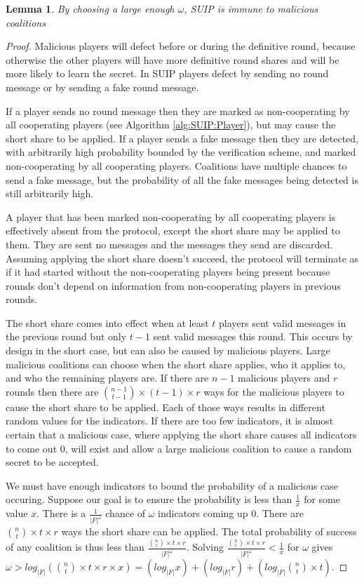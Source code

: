 \documentclass{dalcsthesis}
\newtheorem{lemma}{Lemma}
\begin{document}
\begin{lemma} By choosing a large enough $\omega$, SUIP is immune to malicious coalitions \end{lemma}
\begin{proof}
Malicious players will defect before or during the definitive round, because otherwise the other players will have more definitive round shares and will be more likely to learn the secret. In SUIP players defect by sending no round message or by sending a fake round message.

If a player sends no round message then they are marked as non-cooperating by all cooperating players (see Algorithm \ref{alg:SUIP:Player}), but may cause the short share to be applied. If a player sends a fake message then they are detected, with arbitrarily high probability bounded by the verification scheme, and marked non-cooperating by all cooperating players. Coalitions have multiple chances to send a fake message, but the probability of all the fake messages being detected is still arbitrarily high. 

A player that has been marked non-cooperating by all cooperating players is effectively absent from the protocol, except the short share may be applied to them. They are sent no messages and the messages they send are discarded. Assuming applying the short share doesn't succeed, the protocol will terminate as if it had started without the non-cooperating players being present because rounds don't depend on information from non-cooperating players in previous rounds.

The short share comes into effect when at least $t$ players sent valid messages in the previous round but only $t-1$ sent valid messages this round. This occurs by design in the short case, but can also be caused by malicious players. Large malicious coalitions can choose when the short share applies, who it applies to, and who the remaining players are. If there are $n-1$ malicious players and $r$ rounds then there are ${n-1 \choose t-1} \times (t-1) \times r$ ways for the malicious players to cause the short share to be applied. Each of those ways results in different random values for the indicators. If there are too few indicators, it is almost certain that a malicious case, where applying the short share causes all indicators to come out 0, will exist and allow a large malicious coalition to cause a random secret to be accepted.

We must have enough indicators to bound the probability of a malicious case occuring. Suppose our goal is to ensure the probability is less than $\frac{1}{x}$ for some value $x$. There is a $\frac{1}{|F|^\omega}$ chance of $\omega$ indicators coming up 0. There are ${n \choose t} \times t \times r$ ways the short share can be applied. The total probability of success of any coalition is thus less than $\frac{{n \choose t} \times t \times r}{|F|^\omega}$. Solving $\frac{{n \choose t} \times t \times r}{|F|^\omega} < \frac{1}{x}$ for $\omega$ gives $\omega > log_{|F|} ({n \choose t} \times t \times r \times x) = (log_{|F|} x) + (log_{|F|} r) + (log_{|F|} {n \choose t} \times t)$.


\end{proof}
\end{document}
